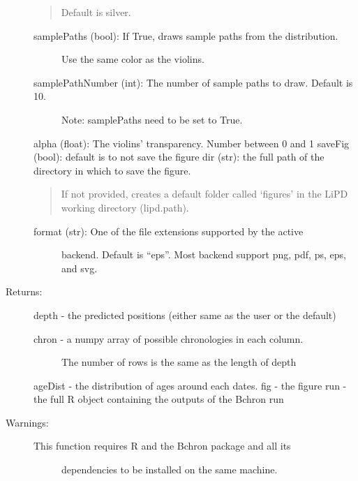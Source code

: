 \documentclass[letterpaper,10pt,english]{sphinxmanual}
\begin{document}
\begin{fulllineitems}
\begin{description}
\begin{quote}
Default is silver.
\end{quote}
\begin{description}
\item[{samplePaths (bool): If True, draws sample paths from the distribution.}] \leavevmode
Use the same color as the violins.

\item[{samplePathNumber (int): The number of sample paths to draw. Default is 10.}] \leavevmode
Note: samplePaths need to be set to True.

\end{description}

alpha (float): The violins’ transparency. Number between 0 and 1
saveFig (bool): default is to not save the figure
dir (str): the full path of the directory in which to save the figure.
\begin{quote}

If not provided, creates a default folder called ‘figures’ in the
LiPD working directory (lipd.path).
\end{quote}
\begin{description}
\item[{format (str): One of the file extensions supported by the active}] \leavevmode
backend. Default is “eps”. Most backend support png, pdf, ps, eps,
and svg.

\end{description}

\item[{Returns:}] \leavevmode
depth - the predicted positions (either same as the user or the default)
\begin{description}
\item[{chron -  a numpy array of possible chronologies in each column.}] \leavevmode
The number of rows is the same as the length of depth

\end{description}

ageDist - the distribution of ages around each dates.
fig - the figure
run - the full R object containing the outputs of the Bchron run

\item[{Warnings:}] \leavevmode\begin{description}
\item[{This function requires R and the Bchron package and all its}] \leavevmode
dependencies to be installed on the same machine.

\end{description}


\end{description}
\end{fulllineitems}
\end{document}
